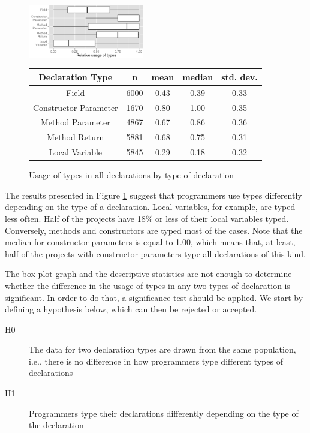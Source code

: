 \documentclass[preprint]{sigplanconf}
\renewcommand{\arraystretch}{1.2}
\begin{document}
\begin{figure}[h]
\centering 
\includegraphics[width=0.45\textwidth]{../analysis/result/all/boxplots/6_declarations_by_type.png} 
\label{fig:all_boxplot_type} 

\vspace{0.3cm}

\renewcommand{\arraystretch}{1.2}
\small
\begin{tabular}{|c|c|c|c|c|}
\hline
Declaration Type		& n		& mean	& median		& std. dev.	\\
\hline
\hline
Field					& 6000	& 0.43	& 0.39		& 0.33		\\ \hline
Constructor Parameter	& 1670	& 0.80	& 1.00		& 0.35		\\ \hline
Method Parameter		& 4867	& 0.67	& 0.86		& 0.36		\\ \hline
Method Return			& 5881	& 0.68	& 0.75		& 0.31		\\ \hline
Local Variable			& 5845	& 0.29	& 0.18		& 0.32		\\ \hline
\end{tabular}

\caption{Usage of types in all declarations by type of declaration}

\end{figure}

The results presented in Figure \ref{fig:all_boxplot_type} suggest that programmers use types differently depending on the type of a declaration.
Local variables, for example, are typed less often.
Half of the projects have 18\% or less of their local variables typed.
Conversely, methods and constructors are typed most of the cases.
Note that the median for constructor parameters is equal to 1.00, which means that, at least, half of the projects with constructor parameters type all declarations of this kind.

The box plot graph and the descriptive statistics are not enough to determine whether the difference in the usage of types in any two types of declaration is significant.
In order to do that, a significance test should be applied. 
We start by defining a hypothesis below, which can then be rejected or accepted.

\begin{description}
\item[H0] The data for two declaration types are drawn from the same population, i.e., there is no difference in how programmers type different types of declarations
\item[H1] Programmers type their declarations differently depending on the type of the declaration
\end{description}
\end{document}
